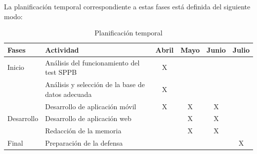 \documentclass[12pt,oneside,a4paper]{article}
\begin{document}
La planificación temporal correspondiente a estas fases está definida del siguiente modo: 
\begin{table}[H]
\begin{tabular}{|l|l|c|c|c|c|}
\hline
\rowcolor[HTML]{DAE8FC} 
Fases                        & Actividad                                         & \multicolumn{1}{l|}{\cellcolor[HTML]{DAE8FC}Abril} & \multicolumn{1}{l|}{\cellcolor[HTML]{DAE8FC}Mayo} & \multicolumn{1}{l|}{\cellcolor[HTML]{DAE8FC}Junio} & \multicolumn{1}{l|}{\cellcolor[HTML]{DAE8FC}Julio} \\ \hline
Inicio                       & Análisis del funcionamiento del test SPPB         & X                                                  &                                                   &                                                    &                                                    \\ \hline
                             & Análisis y selección de la base de datos adecuada & X                                                  &                                                   &                                                    &                                                    \\ \cline{2-6} 
                             & Desarrollo de aplicación móvil                    & X                                                  & X                                                 & X                                                  &                                                    \\ \cline{2-6} 
\multirow{-3}{*}{Desarrollo} & Desarrollo de aplicación web                      &                                                    & X                                                 & X                                                  &                                                    \\ \hline
                             & Redacción de la memoria                           &                                                    & X                                                 & X                                                  &                                                    \\ \cline{2-6} 
\multirow{-2}{*}{Final}      & Preparación de la defensa                         &                                                    &                                                   &                                                    & X                                                  \\ \hline
\end{tabular}
\caption{Planificación temporal}
\end{table}
\end{document}
